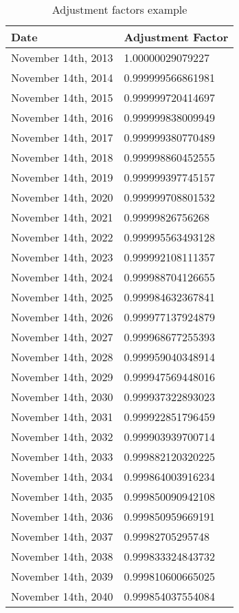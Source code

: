 \documentclass{amsart}
\theoremstyle{plain}
\numberwithin{equation}{section}
\begin{document}
\begin{table}[ht]
\caption{Adjustment factors example}
\begin{tabular}{l | l}
Date & Adjustment Factor \\ \hline
  November 14th, 2013 & 1.00000029079227 \\
  November 14th, 2014 & 0.999999566861981 \\
  November 14th, 2015 & 0.999999720414697 \\
  November 14th, 2016 & 0.999999838009949 \\
  November 14th, 2017 & 0.999999380770489 \\
  November 14th, 2018 & 0.999998860452555 \\
  November 14th, 2019 & 0.999999397745157 \\
  November 14th, 2020 & 0.999999708801532 \\
  November 14th, 2021 & 0.99999826756268 \\
  November 14th, 2022 & 0.999995563493128 \\
  November 14th, 2023 & 0.999992108111357 \\
  November 14th, 2024 & 0.999988704126655 \\
  November 14th, 2025 & 0.999984632367841 \\
  November 14th, 2026 & 0.999977137924879 \\
  November 14th, 2027 & 0.999968677255393 \\
  November 14th, 2028 & 0.999959040348914 \\
  November 14th, 2029 & 0.999947569448016 \\
  November 14th, 2030 & 0.999937322893023 \\
  November 14th, 2031 & 0.999922851796459 \\
  November 14th, 2032 & 0.999903939700714 \\
  November 14th, 2033 & 0.999882120320225 \\
  November 14th, 2034 & 0.999864003916234 \\
  November 14th, 2035 & 0.999850090942108 \\
  November 14th, 2036 & 0.999850959669191 \\
  November 14th, 2037 & 0.99982705295748 \\
  November 14th, 2038 & 0.999833324843732 \\
  November 14th, 2039 & 0.999810600665025 \\
  November 14th, 2040 & 0.999854037554084 \\

\end{tabular}
\end{table}
\end{document}
